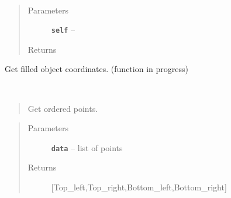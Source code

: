 \documentclass[letterpaper,10pt,english]{sphinxmanual}
\begin{document}
\begin{fulllineitems}
\begin{fulllineitems}
\label{RRtoolbox.lib:RRtoolbox.lib.image.getCoors.updatecoors}~\begin{quote}\begin{description}
\item[{Parameters}] \leavevmode
\textbf{\texttt{self}} -- 

\item[{Returns}] \leavevmode


\end{description}\end{quote}

\end{fulllineitems}


\end{fulllineitems}


\begin{fulllineitems}
\label{RRtoolbox.lib:RRtoolbox.lib.image.getcoors}
\end{fulllineitems}


\begin{fulllineitems}
\label{RRtoolbox.lib:RRtoolbox.lib.image.getgeometrycoors}
Get filled object coordinates. (function in progress)

\end{fulllineitems}


\begin{fulllineitems}
\label{RRtoolbox.lib:RRtoolbox.lib.image.getrectcoors}~\begin{quote}

Get ordered points.
\end{quote}
\begin{quote}\begin{description}
\item[{Parameters}] \leavevmode
\textbf{\texttt{data}} -- list of points

\item[{Returns}] \leavevmode
{[}Top\_left,Top\_right,Bottom\_left,Bottom\_right{]}

\end{description}\end{quote}

\end{fulllineitems}
\end{document}
